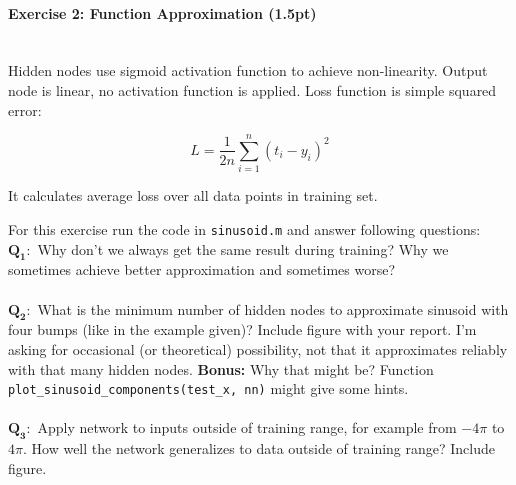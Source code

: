 \documentclass[a4paper,11pt]{article}
\newenvironment{exercise}[3]{\paragraph{Exercise #1: #2 (#3pt)}\ \\}{
\medskip}
\newcommand{\question}[2]{\setlength\parindent{0mm}\ \\$\mathbf{Q_#1:}$ #2\ \\}
\begin{document}
\begin{exercise}{2}{Function Approximation}{1.5}
Hidden nodes use sigmoid activation function to achieve non-linearity. Output node is linear, no activation function is applied. Loss function is simple squared error:

$$
L = \frac{1}{2n}\sum_{i=1}^{n} (t_i - y_i)^2
$$

It calculates average loss over all data points in training set. \newline

For this exercise run the code in \texttt{sinusoid.m} and answer following questions:
\question{1}{Why don't we always get the same result during training? Why we sometimes achieve better approximation and sometimes worse?}
\question{2}{What is the minimum number of hidden nodes to approximate sinusoid with four bumps (like in the example given)? Include figure with your report. I’m asking for occasional (or theoretical) possibility, not that it approximates reliably with that many hidden nodes. \textbf{Bonus:} Why that might be? Function \texttt{plot\_sinusoid\_components(test\_x, nn)}  might give some hints.}
\question{3}{Apply network to inputs outside of training range, for example from $-4\pi$ to $4\pi$. How well the network generalizes to data outside of training range? Include figure.}

\end{exercise}
\end{document}
